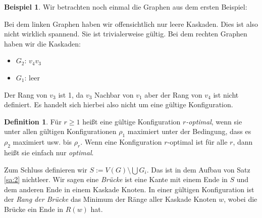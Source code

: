 \documentclass[12pt,a4paper]{scrartcl}
\numberwithin{equation}{section} %
\theoremstyle{definition}
\newtheorem{defn}[auf]{Definition}
\newtheorem{bsp}[auf]{Beispiel}
\theoremstyle{plain}
\begin{document}
\begin{bsp}
    Wir betrachten noch einmal die Graphen aus dem ersten Beispiel:
        \begin{figure}[h]
        \centering
    \end{figure}
    Bei dem linken Graphen haben wir offensichtlich nur leere Kaskaden. Dies ist also nicht wirklich spannend. Sie ist trivialerweise gültig.
    Bei dem rechten Graphen haben wir die Kaskaden:
    \begin{itemize}
        \item $G_2$: $v_4 v_3$
        \item $G_1$: leer
    \end{itemize}
    Der Rang von $v_3$ ist 1, da $v_3$ Nachbar von $v_1$ aber der Rang von $v_4$ ist nicht definiert. Es handelt sich hierbei also nicht um eine gültige Konfiguration.
\end{bsp}
\begin{defn}
Für $r\ge 1$ heißt eine gültige Konfiguration \emph{$r$-optimal}, wenn sie unter allen gültigen Konfigurationen $\rho_1$ maximiert unter der Bedingung, dass es $\rho_2$ maximiert usw. bis $\rho_r$. Wenn eine Konfiguration $r$-optimal ist für alle $r$, dann heißt sie einfach nur \emph{optimal}. \par 
Zum Schluss definieren wir $S:=V(G)\setminus \bigcup G_i$. Das ist in dem Aufbau von Satz \ref{sa:2} nichtleer. Wir sagen eine \emph{Brücke} ist eine Kante mit einem Ende in $S$ und dem anderen Ende in einem Kaskade Knoten. In einer gültigen Konfiguration ist der \emph{Rang der Brücke} das Minimum der Ränge aller Kaskade Knoten $w$, wobei die Brücke ein Ende in $R(w)$ hat. 
\end{defn}
\end{document}
